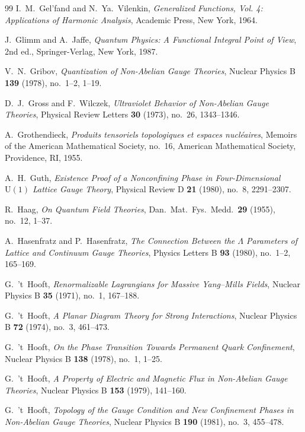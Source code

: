 \begin{thebibliography}{99}
I.~M.~Gel'fand and N.~Ya.~Vilenkin,
\textit{Generalized Functions, Vol. 4: Applications of Harmonic Analysis},
Academic Press, New York, 1964.

J.~Glimm and A.~Jaffe,
\textit{Quantum Physics: A Functional Integral Point of View},
2nd ed., Springer-Verlag, New York, 1987.

V.~N.~Gribov,
\textit{Quantization of Non-Abelian Gauge Theories},
Nuclear Physics B \textbf{139} (1978), no.~1--2, 1--19.

D.~J.~Gross and F.~Wilczek,
\textit{Ultraviolet Behavior of Non-Abelian Gauge Theories},
Physical Review Letters \textbf{30} (1973), no.~26, 1343--1346.

A.~Grothendieck,
\textit{Produits tensoriels topologiques et espaces nucl{\'e}aires},
Memoirs of the American Mathematical Society, no.~16, American Mathematical Society, Providence, RI, 1955.

A.~H.~Guth,
\textit{Existence Proof of a Nonconfining Phase in Four-Dimensional $\mathrm{U}(1)$ Lattice Gauge Theory},
Physical Review D \textbf{21} (1980), no.~8, 2291--2307.

R.~Haag,
\textit{On Quantum Field Theories},
Dan.\ Mat.\ Fys.\ Medd.\ \textbf{29} (1955), no.~12, 1--37.

A.~Hasenfratz and P.~Hasenfratz,
\textit{The Connection Between the $\Lambda$ Parameters of Lattice and Continuum Gauge Theories},
Physics Letters B \textbf{93} (1980), no.~1--2, 165--169.

G.~'t~Hooft,
\textit{Renormalizable Lagrangians for Massive Yang--Mills Fields},
Nuclear Physics B \textbf{35} (1971), no.~1, 167--188.

G.~'t~Hooft,
\textit{A Planar Diagram Theory for Strong Interactions},
Nuclear Physics B \textbf{72} (1974), no.~3, 461--473.

G.~'t~Hooft,
\textit{On the Phase Transition Towards Permanent Quark Confinement},
Nuclear Physics B \textbf{138} (1978), no.~1, 1--25.

G.~'t~Hooft,
\textit{A Property of Electric and Magnetic Flux in Non-Abelian Gauge Theories},
Nuclear Physics B \textbf{153} (1979), 141--160.

G.~'t~Hooft,
\textit{Topology of the Gauge Condition and New Confinement Phases in Non-Abelian Gauge Theories},
Nuclear Physics B \textbf{190} (1981), no.~3, 455--478.


\end{thebibliography}
